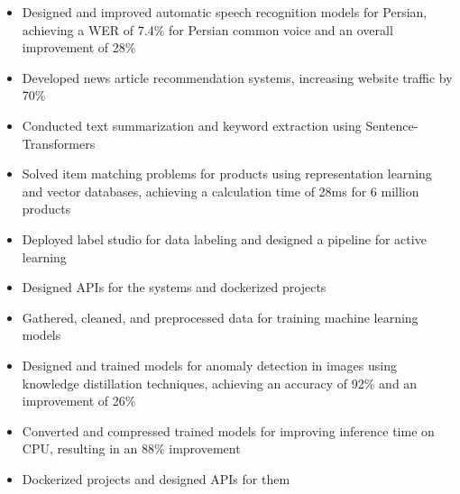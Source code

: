 \documentclass[10pt,a4paper]{altacv}
\begin{document}
\begin{paracol}{2}




	\begin{itemize}
		\justifying
		\item \small{Designed and improved automatic speech recognition models for Persian, achieving a WER of 7.4\% for Persian common voice and an overall improvement of 28\%}
		\item\small{Developed news article recommendation systems, increasing website traffic by 70\%}
		\item\small{Conducted text summarization and keyword extraction using Sentence-Transformers}
		\item\small{Solved item matching problems for products using representation learning and vector databases, achieving a calculation time of 28ms for 6 million products}
		\item\small{Deployed label studio for data labeling and designed a pipeline for active learning}
		\item\small{Designed APIs for the systems and dockerized projects}
	\end{itemize}
\divider

\begin{itemize}
	\justifying
\item \small{Gathered, cleaned, and preprocessed data for training machine learning models}
\item\small{Designed and trained models for anomaly detection in images using knowledge distillation techniques, achieving an accuracy of 92\% and an improvement of 26\%}
\item\small{Converted and compressed trained models for improving inference time on CPU, resulting in an 88\% improvement}
\item\small{Dockerized projects and designed APIs for them}
\end{itemize}


\end{paracol}
\end{document}
